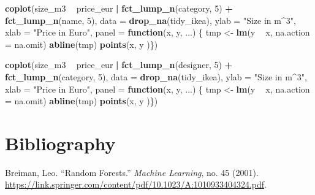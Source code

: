 \documentclass[a4paper, nobind]{templates/ociamthesis}
\newenvironment{Shaded}{\begin{snugshade}}{\end{snugshade}}
\newcommand{\ControlFlowTok}[1]{\textcolor[rgb]{0.13,0.29,0.53}{\textbf{#1}}}
\newcommand{\DataTypeTok}[1]{\textcolor[rgb]{0.13,0.29,0.53}{#1}}
\newcommand{\DecValTok}[1]{\textcolor[rgb]{0.00,0.00,0.81}{#1}}
\newcommand{\KeywordTok}[1]{\textcolor[rgb]{0.13,0.29,0.53}{\textbf{#1}}}
\newcommand{\NormalTok}[1]{#1}
\newcommand{\OperatorTok}[1]{\textcolor[rgb]{0.81,0.36,0.00}{\textbf{#1}}}
\newcommand{\StringTok}[1]{\textcolor[rgb]{0.31,0.60,0.02}{#1}}
\renewenvironment{Shaded}
{
  \vspace{4pt}%
  \begin{snugshade}%
}{%
  \end{snugshade}%
  \vspace{4pt}%
}
\begin{document}
\begin{Shaded}
\begin{Highlighting}[]
\KeywordTok{coplot}\NormalTok{(size_m3 }\OperatorTok{~}\StringTok{ }\NormalTok{price_eur }\OperatorTok{|}\StringTok{ }\KeywordTok{fct_lump_n}\NormalTok{(category, }\DecValTok{5}\NormalTok{) }\OperatorTok{+}\StringTok{ }
\StringTok{         }\KeywordTok{fct_lump_n}\NormalTok{(name, }\DecValTok{5}\NormalTok{), }\DataTypeTok{data =} \KeywordTok{drop_na}\NormalTok{(tidy_ikea), }\DataTypeTok{ylab =} \StringTok{"Size in m^3"}\NormalTok{,}
       \DataTypeTok{xlab =} \StringTok{"Price in Euro"}\NormalTok{, }\DataTypeTok{panel =} \ControlFlowTok{function}\NormalTok{(x, y, ...) \{}
\NormalTok{         tmp <-}\StringTok{ }\KeywordTok{lm}\NormalTok{(y }\OperatorTok{~}\StringTok{ }\NormalTok{x, }\DataTypeTok{na.action =}\NormalTok{ na.omit)}
         \KeywordTok{abline}\NormalTok{(tmp)}
         \KeywordTok{points}\NormalTok{(x, y )\})}
\end{Highlighting}
\end{Shaded}

\begin{Shaded}
\begin{Highlighting}[]
\KeywordTok{coplot}\NormalTok{(size_m3 }\OperatorTok{~}\StringTok{ }\NormalTok{price_eur }\OperatorTok{|}\StringTok{ }\KeywordTok{fct_lump_n}\NormalTok{(designer, }\DecValTok{5}\NormalTok{) }\OperatorTok{+}\StringTok{ }
\StringTok{         }\KeywordTok{fct_lump_n}\NormalTok{(category, }\DecValTok{5}\NormalTok{), }\DataTypeTok{data =} \KeywordTok{drop_na}\NormalTok{(tidy_ikea), }
       \DataTypeTok{ylab =} \StringTok{"Size in m^3"}\NormalTok{,}
       \DataTypeTok{xlab =} \StringTok{"Price in Euro"}\NormalTok{, }\DataTypeTok{panel =} \ControlFlowTok{function}\NormalTok{(x, y, ...) \{}
\NormalTok{         tmp <-}\StringTok{ }\KeywordTok{lm}\NormalTok{(y }\OperatorTok{~}\StringTok{ }\NormalTok{x, }\DataTypeTok{na.action =}\NormalTok{ na.omit)}
         \KeywordTok{abline}\NormalTok{(tmp)}
         \KeywordTok{points}\NormalTok{(x, y )\})}
\end{Highlighting}
\end{Shaded}

\hypertarget{bibliography}{%
\chapter{Bibliography}\label{bibliography}}

\hypertarget{refs}{}
\leavevmode\hypertarget{ref-Breiman2001}{}%
Breiman, Leo. ``Random Forests.'' \emph{Machine Learning}, no. 45 (2001). \url{https://link.springer.com/content/pdf/10.1023/A:1010933404324.pdf}.
\end{document}
